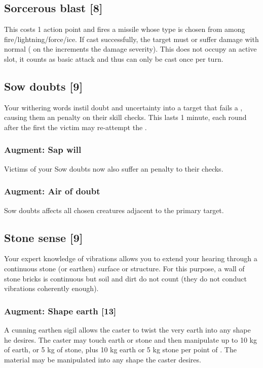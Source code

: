 \subsection{Sorcerous blast [8]}
\label{spell:sorc-blast}
This costs 1 action point and fires a missile whose type is chosen from among fire/lightning/force/ice. If cast successfully, the target must  or suffer damage with normal  ( on the  increments the damage severity). This does not occupy an active  slot, it counts as basic attack and thus can only be cast once per turn.

\subsection{Sow doubts [9]}
Your withering words instil doubt and uncertainty into a target that fails a , causing them an  penalty on their skill checks. This lasts 1 minute, each round after the first the victim may re-attempt the . 
\subsubsection{Augment: Sap will}
Victims of your Sow doubts now also suffer an  penalty to their  checks.
\subsubsection{Augment: Air of doubt}
Sow doubts affects all chosen creatures adjacent to the primary target.

\subsection{Stone sense [9]}
\label{spell:stone-sense}
Your expert knowledge of vibrations allows you to extend your hearing through a continuous stone (or earthen) surface or structure. For this purpose, a wall of stone bricks is continuous but soil and dirt do not count (they do not conduct vibrations coherently enough). 
\subsubsection{Augment: Shape earth [13]}
A cunning earthen sigil allows the caster to twist the very earth into any shape he desires. The caster may touch earth or stone and then manipulate up to 10 kg of earth, or 5 kg of stone, plus 10 kg earth or 5 kg stone per point of . The material may be manipulated into any shape the caster desires.

